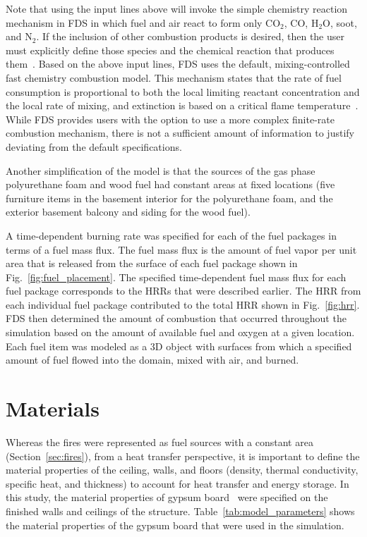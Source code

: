 \documentclass[12pt,oneside]{book}
\begin{document}
Note that using the input lines above will invoke the simple chemistry reaction mechanism in FDS in which fuel and air react to form only CO$_2$, CO, H$_2$O, soot, and N$_2$. If the inclusion of other combustion products is desired, then the user must explicitly define those species and the chemical reaction that produces them~\cite{FDS_Users_Guide}. Based on the above input lines, FDS uses the default, mixing-controlled fast chemistry combustion model. This mechanism states that the rate of fuel consumption is proportional to both the local limiting reactant concentration and the local rate of mixing, and extinction is based on a critical flame temperature~\cite{FDS_Math_Guide}. While FDS provides users with the option to use a more complex finite-rate combustion mechanism, there is not a sufficient amount of information to justify deviating from the default specifications.

Another simplification of the model is that the sources of the gas phase polyurethane foam and wood fuel had constant areas at fixed locations (five furniture items in the basement interior for the polyurethane foam, and the exterior basement balcony and siding for the wood fuel).

A time-dependent burning rate was specified for each of the fuel packages in terms of a fuel mass flux. The fuel mass flux is the amount of fuel vapor per unit area that is released from the surface of each fuel package shown in Fig.~\ref{fig:fuel_placement}. The specified time-dependent fuel mass flux for each fuel package corresponds to the HRRs that were described earlier. The HRR from each individual fuel package contributed to the total HRR shown in Fig.~\ref{fig:hrr}. FDS then determined the amount of combustion that occurred throughout the simulation based on the amount of available fuel and oxygen at a given location. Each fuel item was modeled as a 3D object with surfaces from which a specified amount of fuel flowed into the domain, mixed with air, and burned.

\section{Materials}
\label{sec:materials}

Whereas the fires were represented as fuel sources with a constant area (Section~\ref{sec:fires}), from a heat transfer perspective, it is important to define the material properties of the ceiling, walls, and floors (density, thermal conductivity, specific heat, and thickness) to account for heat transfer and energy storage. In this study, the material properties of gypsum board~\cite{WAKILI2007} were specified on the finished walls and ceilings of the structure. Table~\ref{tab:model_parameters} shows the material properties of the gypsum board that were used in the simulation.
\end{document}
